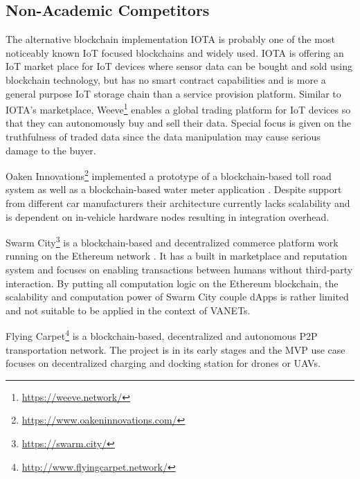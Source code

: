 \documentclass{llncs}
\begin{document}
{		%
			
		\subsection{Non-Academic Competitors}
			\label{sss:non-academic-competitors}

			The alternative blockchain implementation IOTA \cite{iotaWhitepaper} is probably one of the most noticeably known IoT focused blockchains and widely used. IOTA is offering an IoT market place \cite{iotaMarketplace} for IoT devices where sensor data can be bought and sold using blockchain technology, but has no smart contract capabilities and is more a general purpose IoT storage chain than a service provision platform. Similar to IOTA's marketplace, Weeve\footnote{\url{https://weeve.network/}} \cite{weeveWhitepaper} enables a global trading platform for IoT devices so that they can autonomously buy and sell their data. Special focus is given on the truthfulness of traded data since the data manipulation may cause serious damage to the buyer.
			
			Oaken Innovations\footnote{\url{https://www.oakeninnovations.com/}} implemented a prototype of a blockchain-based toll road system \cite{oakenTeslaTollbooth} as well as a blockchain-based water meter application \cite{oakenWaterMeter}. Despite support from different car manufacturers their architecture currently lacks scalability and is dependent on in-vehicle hardware nodes resulting in integration overhead. 
			
			Swarm City\footnote{\url{https://swarm.city/}} is a blockchain-based and decentralized commerce platform work running on the Ethereum network \cite{swarmWhitepaper1}\cite{swarmWhitepaper2}. It has a built in marketplace and reputation system and focuses on enabling transactions between humans without third-party interaction. By putting all computation logic on the Ethereum blockchain, the scalability and computation power of Swarm City couple dApps is rather limited and not suitable to be applied in the context of VANETs.

			Flying Carpet\footnote{\url{http://www.flyingcarpet.network/}} is a blockchain-based, decentralized and autonomous P2P transportation network. The project is in its early stages and the MVP use case focuses on decentralized charging and docking station for drones or UAVs.

}
\end{document}

